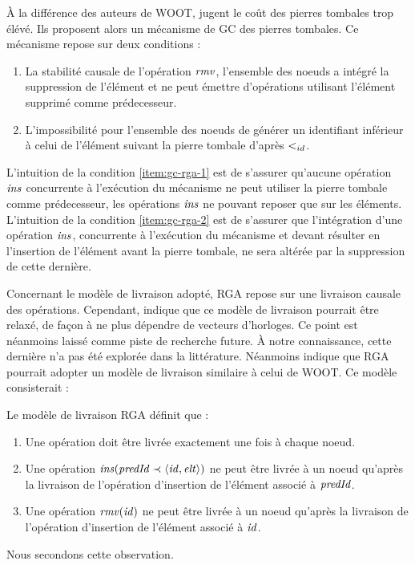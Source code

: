 À la différence des auteurs de WOOT, \textcite{ROH2011354} jugent le coût des pierres tombales trop élévé.
Ils proposent alors un mécanisme de \acf{GC} des pierres tombales.
Ce mécanisme repose sur deux conditions :
\label{sec:gc-rga}
\begin{enumerate}
  \item \label{item:gc-rga-1}
    La stabilité causale de l'opération $\mathit{rmv}$, \ie l'ensemble des noeuds a intégré la suppression de l'élément et ne peut émettre d'opérations utilisant l'élément supprimé comme prédecesseur.
  \item \label{item:gc-rga-2}
    L'impossibilité pour l'ensemble des noeuds de générer un identifiant inférieur à celui de l'élément suivant la pierre tombale d'après $<_{id}$.
\end{enumerate}
L'intuition de la condition \ref{item:gc-rga-1} est de s'assurer qu'aucune opération $\mathit{ins}$ concurrente à l'exécution du mécanisme ne peut utiliser la pierre tombale comme prédecesseur, les opérations $\mathit{ins}$ ne pouvant reposer que sur les éléments.
L'intuition de la condition \ref{item:gc-rga-2} est de s'assurer que l'intégration d'une opération $\mathit{ins}$, concurrente à l'exécution du mécanisme et devant résulter en l'insertion de l'élément avant la pierre tombale, ne sera altérée par la suppression de cette dernière.

Concernant le modèle de livraison adopté, \ac{RGA} repose sur une livraison causale des opérations.
Cependant, \cite{ROH2011354} indique que ce modèle de livraison pourrait être relaxé, de façon à ne plus dépendre de vecteurs d'horloges.
Ce point est néanmoins laissé comme piste de recherche future.
À notre connaissance, cette dernière n'a pas été explorée dans la littérature.
Néanmoins \textcite{2021-these-vic} indique que \ac{RGA} pourrait adopter un modèle de livraison similaire à celui de WOOT.
Ce modèle consisterait :
\begin{definition}
  Le modèle de livraison \ac{RGA} définit que :
  \begin{enumerate}
    \item Une opération doit être livrée exactement une fois à chaque noeud.
    \item Une opération $\mathit{ins}(\mathit{predId} \prec \langle \mathit{id},\mathit{elt} \rangle)$ ne peut être livrée à un noeud qu'après la livraison de l'opération d'insertion de l'élément associé à $\mathit{predId}$.
    \item Une opération $\mathit{rmv}(\mathit{id})$ ne peut être livrée à un noeud qu'après la livraison de l'opération d'insertion de l'élément associé à $\mathit{id}$.
  \end{enumerate}
\end{definition}
Nous secondons cette observation.

